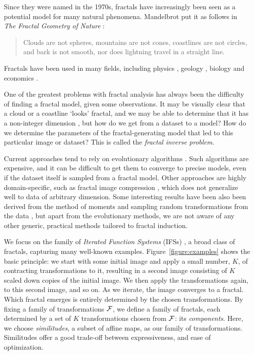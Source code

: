\documentclass[reprint,amsmath,amssymb,aps,prl]{revtex4-1}
\begin{document}
Since they were named in the 1970s, fractals have increasingly been seen as a potential model for many natural phenomena. Mandelbrot put it as follows in \emph{The Fractal Geometry of Nature} \cite{mandelbrot1982fractal}: 
\begin{quote}
\noindent Clouds are not spheres, mountains are not cones, coastlines are not circles, and bark is not smooth, nor does lightning travel in a straight line.
\end{quote}
Fractals have been used in many fields, including physics \cite{mandelbrot1984fractals}, geology \cite{cheng1997multifractal}, biology \cite{goldberger1992fractal} and economics \cite{turiel2003multifractal}.

One of the greatest problems with fractal analysis has always been the difficulty of finding a fractal model, given some observations. It may be visually clear that a cloud or a coastline `looks' fractal, and we may be able to determine that it has a non-integer dimension \cite{theiler1990estimating}, but how do we get from a dataset to a model? How do we determine the parameters of the fractal-generating model that led to this particular image or dataset? This is called the \emph{fractal inverse problem}.

Current approaches tend to rely on evolutionary algorithms \cite{deliu1991genetic,collet2000polar,nettleton1994evolutionary}. Such algorithms are expensive, and it can be difficult to get them to converge to precise models, even if the dataset itself is sampled from a fractal model. Other approaches are highly domain-specific, such as fractal image compression \cite{hart1996fractal}, which does not generalize well to data of arbitrary dimension. Some interesting results have been also been derived from the method of moments \cite{rinaldo1994inverse} and sampling random transformations from the data \cite{hart1997similarity}, but apart from the evolutionary methods, we are not aware of any other generic, practical methods tailored to fractal induction. 

We focus on the family of \emph{Iterated Function Systems} (IFSs) \cite{barnsley2014fractals,hutchinson2000deterministic}, a broad class of fractals, capturing many well-known examples. Figure~\ref{figure:examples} shows the basic principle: we start with some initial image and apply a small number, $K$, of contracting transformations to it, resulting in a second image consisting of $K$ scaled down copies of the initial image. We then apply the transformations again, to this second image, and so on. As we iterate, the image converges to a fractal. Which fractal emerges is entirely determined by the chosen transformations. By fixing a family of transformations $\cal F$, we define a family of fractals, each determined by a set of $K$ transformations chosen from $\cal F$: its \emph{components}. Here, we choose \emph{similitudes}, a subset of affine maps, as our family of transformations. Similitudes offer a good trade-off between expressiveness, and ease of optimization. 
\end{document}

